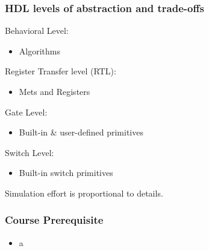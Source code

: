 \documentclass[t]{beamer}
\begin{document}
\begin{frame}
\frametitle{HDL levels of abstraction and trade-offs}

Behavioral Level:
\begin{itemize}
\item Algorithms
\end{itemize}

Register Transfer level (RTL):
\begin{itemize}
\item Mets and Registers
\end{itemize}

Gate Level:
\begin{itemize}
\item Built-in \& user-defined primitives
\end{itemize}

Switch Level:
\begin{itemize}
\item Built-in switch primitives
\end{itemize}

\vspace{12pt}
Simulation effort is proportional to details.
\end{frame}

\begin{frame}
\frametitle{Course Prerequisite}

\begin{itemize}
\item a
\end{itemize}
\end{frame}
\end{document}
